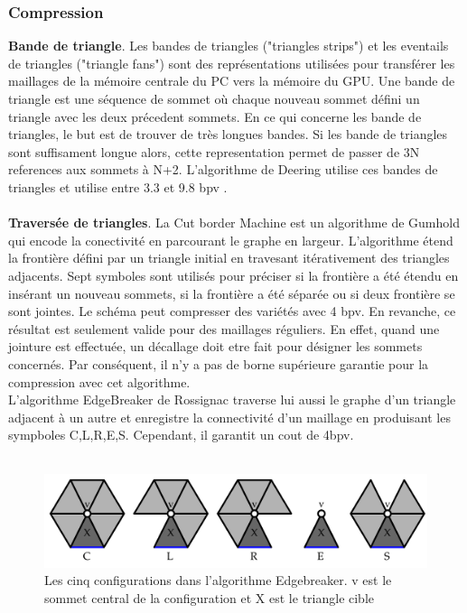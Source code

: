 \documentclass[a4paper,11pt,openany]{article}
\begin{document}
\subsubsection{Compression}
\noindent
\textbf{Bande de triangle}. Les bandes de triangles ("triangles strips") et les eventails de triangles ("triangle fans") sont des représentations utilisées pour transférer les maillages de la mémoire centrale du PC vers la mémoire du GPU. Une bande de triangle est une séquence de sommet où chaque nouveau sommet défini un triangle avec les deux précedent sommets. En ce qui concerne les bande de triangles, le but est de trouver de très longues bandes. Si les bande de triangles sont suffisament longue alors, cette representation permet de passer de 3N references aux sommets à N+2. L'algorithme de Deering utilise ces bandes de triangles et utilise entre 3.3 et 9.8 bpv \cite{triangle_strips}.\\\\
\textbf{Traversée de triangles}. La Cut border Machine \cite{cut_border_machine_2d} est un algorithme de Gumhold qui encode la conectivité en parcourant le graphe en largeur. L'algorithme étend la frontière défini par un triangle initial en travesant itérativement des triangles adjacents. Sept symboles sont utilisés pour préciser si la frontière a été étendu en insérant un nouveau sommets, si la frontière a été séparée ou si deux frontière se sont jointes. Le schéma peut compresser des variétés avec 4 bpv. En revanche, ce résultat est seulement valide pour des maillages réguliers. En effet, quand une jointure est effectuée, un décallage doit etre fait pour désigner les sommets concernés. Par conséquent, il n'y a pas de borne supérieure garantie pour la compression avec cet algorithme.\\
L'algorithme EdgeBreaker de Rossignac \cite{edgebreaker} traverse lui aussi le graphe d'un triangle adjacent à un autre et enregistre la connectivité d'un maillage en produisant les sympboles C,L,R,E,S. Cependant, il garantit un cout de 4bpv.\\\\
\begin{figure}[H]
\begin{center}
\includegraphics[scale=0.2]{Images/edgebreaker}
\caption{Les cinq configurations dans l'algorithme Edgebreaker. v est le sommet central de la configuration et X est le triangle cible}
\label{fig:edgebreaker}
\end{center}
\end{figure}
\end{document}

